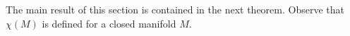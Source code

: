The main result of this section is contained in the next theorem. Observe that $\chi(M)$ is defined for a closed manifold $M$.
